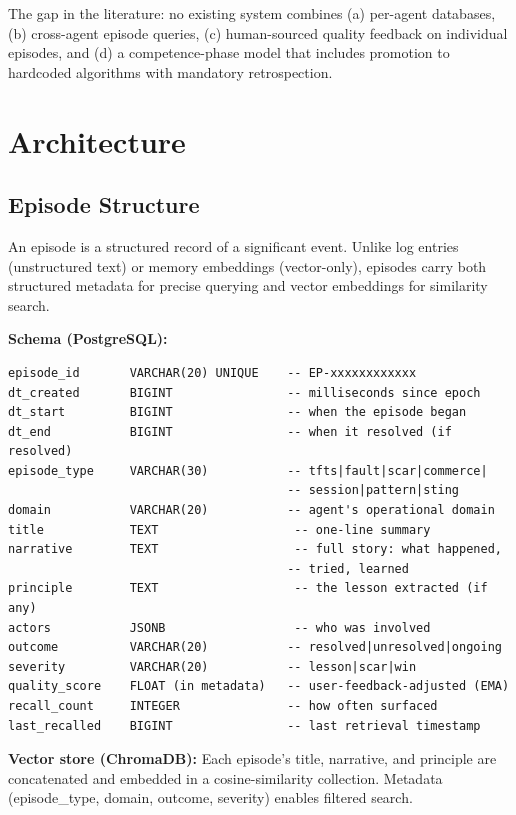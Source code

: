 \documentclass[11pt,a4paper]{article}
\begin{document}
The gap in the literature: no existing system combines (a) per-agent databases, (b) cross-agent episode queries, (c) human-sourced quality feedback on individual episodes, and (d) a competence-phase model that includes promotion to hardcoded algorithms with mandatory retrospection.

\section{Architecture}

\subsection{Episode Structure}

An episode is a structured record of a significant event. Unlike log entries (unstructured text) or memory embeddings (vector-only), episodes carry both structured metadata for precise querying and vector embeddings for similarity search.

\textbf{Schema (PostgreSQL):}

\begin{lstlisting}
episode_id       VARCHAR(20) UNIQUE    -- EP-xxxxxxxxxxxx
dt_created       BIGINT                -- milliseconds since epoch
dt_start         BIGINT                -- when the episode began
dt_end           BIGINT                -- when it resolved (if resolved)
episode_type     VARCHAR(30)           -- tfts|fault|scar|commerce|
                                       -- session|pattern|sting
domain           VARCHAR(20)           -- agent's operational domain
title            TEXT                   -- one-line summary
narrative        TEXT                   -- full story: what happened,
                                       -- tried, learned
principle        TEXT                   -- the lesson extracted (if any)
actors           JSONB                  -- who was involved
outcome          VARCHAR(20)           -- resolved|unresolved|ongoing
severity         VARCHAR(20)           -- lesson|scar|win
quality_score    FLOAT (in metadata)   -- user-feedback-adjusted (EMA)
recall_count     INTEGER               -- how often surfaced
last_recalled    BIGINT                -- last retrieval timestamp
\end{lstlisting}

\textbf{Vector store (ChromaDB):} Each episode's title, narrative, and principle are concatenated and embedded in a cosine-similarity collection. Metadata (episode\_type, domain, outcome, severity) enables filtered search.
\end{document}

